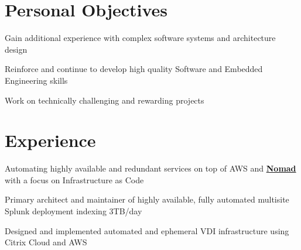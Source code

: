 \documentclass[letterpaper]{deedy-resume} %
\begin{document}
%
\begin{minipage}[t]{0.66\textwidth} %


\section{Personal Objectives}
\vspace{\topsep} %
\begin{tightitemize}
\item Gain additional experience with complex software systems and architecture design
\item Reinforce and continue to develop high quality Software and Embedded Engineering skills
\item Work on technically challenging and rewarding projects
\end{tightitemize}


\section{Experience}


\begin{tightitemize}
\item Automating highly available and redundant services on top of AWS and \href{https://www.nomadproject.io}{\bf Nomad} with a focus on Infrastructure as Code
\item Primary architect and maintainer of highly available, fully automated multisite Splunk deployment indexing 3TB/day
\item Designed and implemented automated and ephemeral VDI infrastructure using Citrix Cloud and AWS
\end{tightitemize}

\sectionspace %


\end{minipage}
\end{document}
